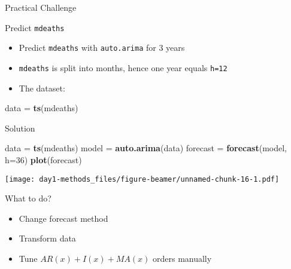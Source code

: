 \documentclass[ignorenonframetext,]{beamer}
\newenvironment{Shaded}{\begin{snugshade}}{\end{snugshade}}
\newcommand{\KeywordTok}[1]{\textcolor[rgb]{0.13,0.29,0.53}{\textbf{#1}}}
\newcommand{\DataTypeTok}[1]{\textcolor[rgb]{0.13,0.29,0.53}{#1}}
\newcommand{\DecValTok}[1]{\textcolor[rgb]{0.00,0.00,0.81}{#1}}
\newcommand{\StringTok}[1]{\textcolor[rgb]{0.31,0.60,0.02}{#1}}
\newcommand{\NormalTok}[1]{#1}
\providecommand{\tightlist}{%
  \setlength{\itemsep}{0pt}\setlength{\parskip}{0pt}}
\begin{document}
\begin{frame}[fragile]{Practical Challenge}

\begin{block}{Predict \texttt{mdeaths}}

\begin{itemize}
\tightlist
\item
  Predict \texttt{mdeaths} with \texttt{auto.arima} for 3 years
\item
  \texttt{mdeaths} is split into months, hence one year equals
  \texttt{h=12}
\item
  The dataset:
\end{itemize}

\begin{Shaded}
\begin{Highlighting}[]
\NormalTok{data =}\StringTok{ }\KeywordTok{ts}\NormalTok{(mdeaths)}
\end{Highlighting}
\end{Shaded}

\end{block}

\begin{block}{Solution}

\begin{Shaded}
\begin{Highlighting}[]
\NormalTok{data =}\StringTok{ }\KeywordTok{ts}\NormalTok{(mdeaths)}
\NormalTok{model =}\StringTok{ }\KeywordTok{auto.arima}\NormalTok{(data)}
\NormalTok{forecast =}\StringTok{ }\KeywordTok{forecast}\NormalTok{(model, }\DataTypeTok{h=}\DecValTok{36}\NormalTok{)}
\KeywordTok{plot}\NormalTok{(forecast)}
\end{Highlighting}
\end{Shaded}

\texttt{[image: day1-methods\_files/figure-beamer/unnamed-chunk-16-1.pdf]}

\end{block}

\begin{block}{What to do?}

\begin{itemize}
\tightlist
\item
  Change forecast method
\item
  Transform data
\item
  Tune \(AR(x) + I(x) + MA(x)\) orders manually
\end{itemize}

\end{block}

\end{frame}
\end{document}
